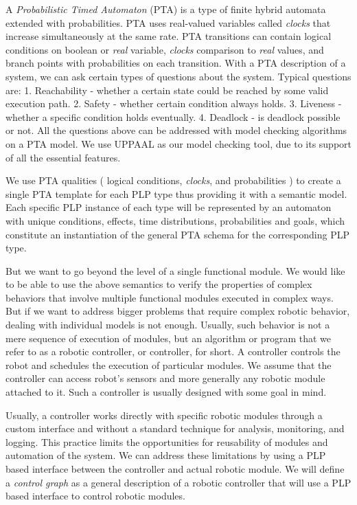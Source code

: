 \par A \textit{Probabilistic Timed Automaton} (PTA) is a type of finite hybrid automata extended with probabilities. PTA uses real-valued variables called \textit{clocks} that increase simultaneously at the same rate. PTA transitions can contain logical conditions on boolean or \textit{real} variable, \textit{clocks} comparison to \textit{real} values, and branch points with probabilities on each transition. With a PTA description of a system, we can ask certain types of questions about the system. Typical questions are: 1. Reachability - whether a certain state could be reached by some valid execution path. 2. Safety - whether certain condition always holds. 3. Liveness - whether a specific condition holds eventually. 4. Deadlock - is deadlock possible or not. All the questions above can be addressed with model checking algorithms on a PTA model. We use UPPAAL \cite{uppaalIntroduction} \cite{tutorialUppaal} as our model checking tool, due to its support of all the essential features.
\par We use PTA qualities ( logical conditions, \textit{clocks}, and probabilities ) to create a single PTA template for each PLP type thus providing it with a semantic model. Each specific PLP instance of each type will be represented by an automaton with unique conditions, effects, time distributions, probabilities and goals, which constitute an instantiation of the general PTA schema for the corresponding PLP type. 
\par But we want to go beyond the level of a single functional module. We would like to be able to use the above semantics to verify the properties of complex behaviors that involve multiple functional modules executed in complex ways. But if we want to address bigger problems that require complex robotic behavior, dealing with individual models is not enough. Usually, such behavior is not a mere sequence of execution of modules, but an algorithm or program that we refer to as a robotic controller, or controller, for short. A controller controls the robot and schedules the execution of particular modules. We assume that the controller can access robot’s sensors and more generally any robotic module attached to it. Such a controller is usually designed with some goal in mind.
\par Usually, a controller works directly with specific robotic modules through a custom interface and without a standard technique for analysis, monitoring, and logging. This practice limits the opportunities for reusability of modules and automation of the system. We can address these limitations by using a PLP based interface between the controller and actual robotic module. We will define a \textit{control graph} as a general description of a robotic controller that will use a PLP based interface to control robotic modules. 
